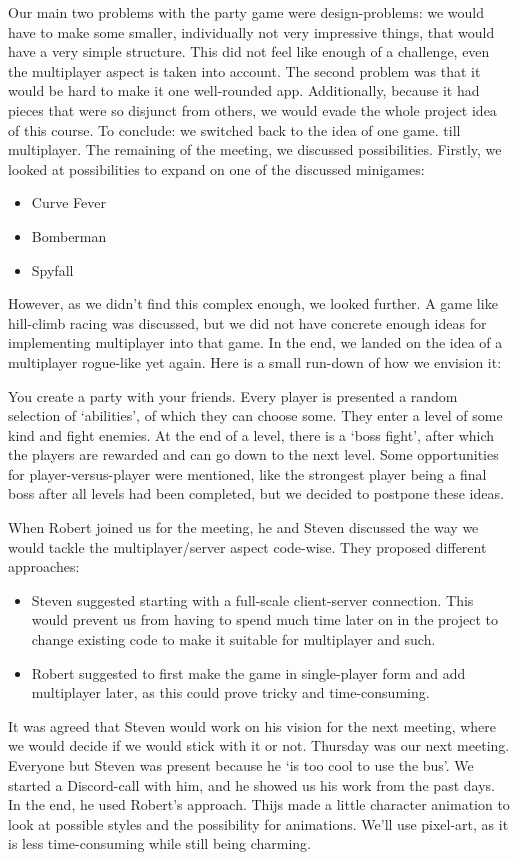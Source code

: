 \documentclass[../main.tex]{subfiles}
\begin{document}
Our main two problems with the party game were design-problems: we would have to make some smaller, individually not very impressive things, that would have a very simple structure. This did not feel like enough of a challenge, even the multiplayer aspect is taken into account. The second problem was that it would be hard to make it one well-rounded app. Additionally, because it had pieces that were so disjunct from others, we would evade the whole project idea of this course. To conclude: we switched back to the idea of one game. till multiplayer. The remaining of the meeting, we discussed possibilities. Firstly, we looked at possibilities to expand on one of the discussed minigames:
\begin{itemize}
	\item Curve Fever
	\item Bomberman
	\item Spyfall
\end{itemize}
However, as we didn't find this complex enough, we looked further. A game like hill-climb racing was discussed, but we did not have concrete enough ideas for implementing multiplayer into that game. In the end, we landed on the idea of a multiplayer rogue-like yet again. Here is a small run-down of how we envision it:

You create a party with your friends. Every player is presented a random selection of `abilities', of which they can choose some. They enter a level of some kind and fight enemies. At the end of a level, there is a `boss fight', after which the players are rewarded and can go down to the next level. Some opportunities for player-versus-player were mentioned, like the strongest player being a final boss after all levels had been completed, but we decided to postpone these ideas.

When Robert joined us for the meeting, he and Steven discussed the way we would tackle the multiplayer/server aspect code-wise. They proposed different approaches:
\begin{itemize}
	\item Steven suggested starting with a full-scale client-server connection. This would prevent us from having to spend much time later on in the project to change existing code to make it suitable for multiplayer and such.
	\item Robert suggested to first make the game in single-player form and add multiplayer later, as this could prove tricky and time-consuming.
\end{itemize} 
It was agreed that Steven would work on his vision for the next meeting, where we would decide if we would stick with it or not.
\bigbreak\noindent
Thursday was our next meeting. Everyone but Steven was present because he `is too cool to use the bus'. We started a Discord-call with him, and he showed us his work from the past days. In the end, he used Robert's approach. Thijs made a little character animation to look at possible styles and the possibility for animations. We'll use pixel-art, as it is less time-consuming while still being charming.
\end{document}
